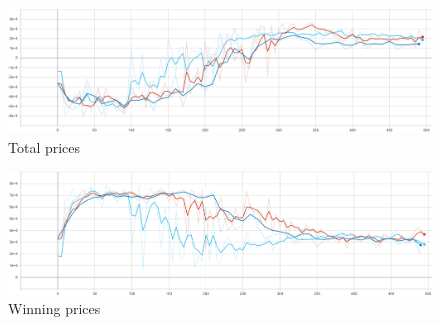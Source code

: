 \begin{figure}[h]
    \centering
    \includegraphics[width=17cm]{figures/4_test_eval_figs/algo_training_fig/total_prices.png}
    \caption{Total prices}
    \label{fig:algo_total_prices}
\end{figure}

\begin{figure}[h]
    \centering
    \includegraphics[width=17cm]{figures/4_test_eval_figs/algo_training_fig/total_winning_prices.PNG}
    \caption{Winning prices}
    \label{fig:algo_winning_prices}
\end{figure}

